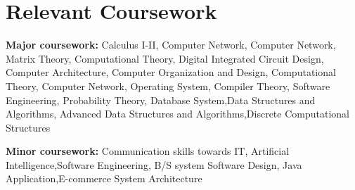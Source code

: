 \documentclass[letterpaper,11pt]{article}
\newcommand{\resumeSubHeadingListStart}{\begin{itemize}[leftmargin=*]}
\newcommand{\resumeSubHeadingListEnd}{\end{itemize}}
\begin{document}
\section{Relevant Coursework}
  \vspace{2pt}
  \resumeSubHeadingListStart
    \small{\item{
        \textbf{Major coursework:}{ Calculus I-II, Computer Network, Computer Network, Matrix Theory, Computational Theory, Digital Integrated Circuit Design, Computer Architecture, Computer Organization and Design, Computational Theory, Computer Network, Operating System, Compiler Theory, Software Engineering, Probability Theory, Database System,Data Structures and Algorithms, Advanced Data Structures and Algorithms,Discrete Computational Structures} \\ \vspace{3pt}
        
        \textbf{Minor coursework:}{ Communication skills towards IT, Artificial Intelligence,Software Engineering,  B/S system Software Design, Java Application,E-commerce System Architecture }
    }}
  \resumeSubHeadingListEnd

\end{document}
